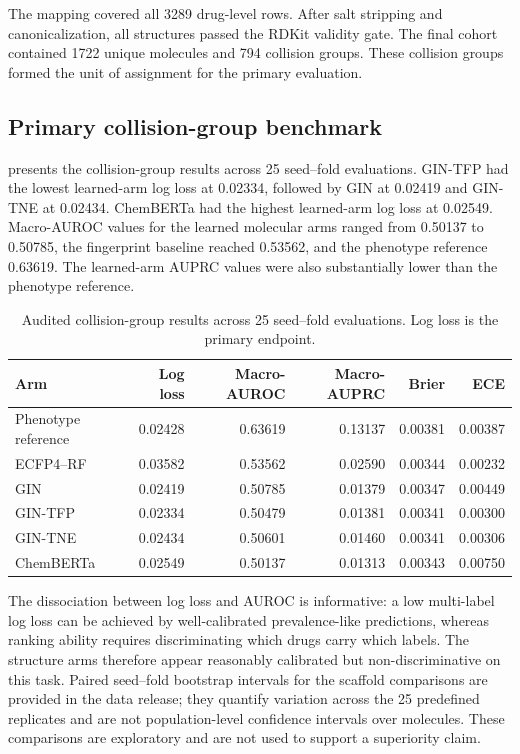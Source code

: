 \documentclass[11pt,a4paper]{article}
\begin{document}
The mapping covered all \num{3289} drug-level rows. After salt stripping and canonicalization, all structures passed the RDKit validity gate. The final cohort contained \num{1722} unique molecules and \num{794} collision groups. These collision groups formed the unit of assignment for the primary evaluation.

\subsection{Primary collision-group benchmark}

 presents the collision-group results across \num{25} seed--fold evaluations. GIN-TFP had the lowest learned-arm log loss at \num{0.02334}, followed by GIN at \num{0.02419} and GIN-TNE at \num{0.02434}. ChemBERTa had the highest learned-arm log loss at \num{0.02549}. Macro-AUROC values for the learned molecular arms ranged from \num{0.50137} to \num{0.50785}, the fingerprint baseline reached \num{0.53562}, and the phenotype reference \num{0.63619}. The learned-arm AUPRC values were also substantially lower than the phenotype reference.

\begin{table}[htbp]
\centering
\caption{Audited collision-group results across \num{25} seed--fold evaluations. Log loss is the primary endpoint.}
\label{tab:p6_primary}
\begin{tabular}{lrrrrr}
\toprule
Arm & Log loss & Macro-AUROC & Macro-AUPRC & Brier & ECE\\
\midrule
Phenotype reference & \num{0.02428} & \num{0.63619} & \num{0.13137} & \num{0.00381} & \num{0.00387}\\
ECFP4--RF & \num{0.03582} & \num{0.53562} & \num{0.02590} & \num{0.00344} & \num{0.00232}\\
GIN & \num{0.02419} & \num{0.50785} & \num{0.01379} & \num{0.00347} & \num{0.00449}\\
GIN-TFP & \num{0.02334} & \num{0.50479} & \num{0.01381} & \num{0.00341} & \num{0.00300}\\
GIN-TNE & \num{0.02434} & \num{0.50601} & \num{0.01460} & \num{0.00341} & \num{0.00306}\\
ChemBERTa & \num{0.02549} & \num{0.50137} & \num{0.01313} & \num{0.00343} & \num{0.00750}\\
\bottomrule
\end{tabular}
\end{table}

The dissociation between log loss and AUROC is informative: a low multi-label log loss can be achieved by well-calibrated prevalence-like predictions, whereas ranking ability requires discriminating which drugs carry which labels. The structure arms therefore appear reasonably calibrated but non-discriminative on this task. Paired seed--fold bootstrap intervals for the scaffold comparisons are provided in the data release; they quantify variation across the 25 predefined replicates and are not population-level confidence intervals over molecules. These comparisons are exploratory and are not used to support a superiority claim.
\end{document}
